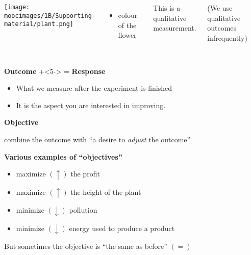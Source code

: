 \documentclass[handout,11pt,aspectratio=169,mathserif]{beamer}
\begin{document}
\begin{frame}\frametitle{}
	
	\begin{columns}[c]
			\centerline{\texttt{[image: \\moocimages/1B/Supporting-material/plant.png]}}
		
			
			\begin{itemize}
				\item	colour of the flower
			\end{itemize}
			
			\vspace{12pt}
			This is a qualitative measurement.
			
			(We use qualitative outcomes infrequently)

	\end{columns}
\end{frame}

\begin{frame}\frametitle{}
	
	\textbf{{\color{purple} Outcome}} \onslide+<5->{ = \textbf{{\color{purple} Response}}}
		\begin{itemize}
			\item	What we measure after the experiment is finished  
			\item	It is the aspect you are interested in improving.
		\end{itemize}
	
	\vspace{12pt}
	\pause
	
	\textbf{{\color{purple} Objective}}
	
	
		\qquad combine the {\color{purple} outcome} with ``a desire to \emph{adjust} the outcome''
	\vspace{24pt}
	\pause
	
	{\textbf{{Various examples of ``objectives''}}}
	
		\begin{itemize}
			\item	maximize $(\uparrow)$ the profit
			\item	maximize $(\uparrow)$ the height of the plant
			\item	minimize $(\downarrow)$ pollution
			\item	minimize $(\downarrow)$ energy used to produce a product
		\end{itemize} 	
		
	\pause
		\vspace{12pt}
		But sometimes the objective is ``the same as before'' $(=)$
\end{frame}
\end{document}
